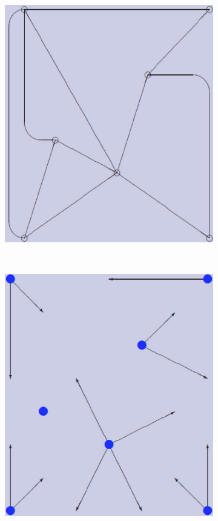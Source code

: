 \documentclass[12pt]{article}
\begin{document}
\begin{figure}[tb]
\begin{subfigure}[b]{0.2\textwidth}
      \caption{}\label{fig:contract_kernel6}
  \end{subfigure}~%
  \begin{subfigure}[b]{0.2\textwidth}
      \includegraphics[width=\textwidth]{img/contract_kernel1}
      \caption{}\label{fig:contract_kernel7}
  \end{subfigure}~%
  \begin{subfigure}[b]{0.2\textwidth}
      \includegraphics[width=\textwidth]{img/contract_kernel8}

\end{subfigure}
\end{figure}
\end{document}
